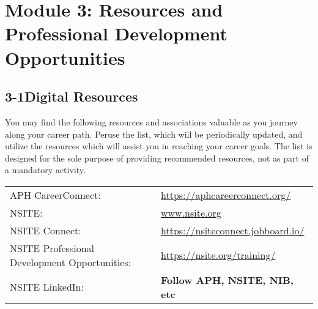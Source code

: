 \pagebreak \section*{Module 3:	Resources and Professional Development Opportunities}
\noindent\makebox[\textwidth]{\rule{\linewidth}{0.4pt}}
 \localtableofcontents
\noindent\makebox[\textwidth]{\rule{\linewidth}{0.4pt}}

\pagebreak \subsection*{3-1\quad Digital Resources}

You may find the following resources and associations valuable as you journey along your career path. Peruse the list, which will be periodically updated, and utilize the resources which will assist you in reaching your career goals. The list is designed for the sole purpose of providing recommended resources, not as part of a mandatory activity.

\begin{table}[h!]
	\centering
	\begin{tabular}{ll}
		APH CareerConnect:\dotfill                            & \href{https://aphcareerconnect.org/}{https://aphcareerconnect.org/}         \\
		NSITE:\dotfill                                        & \href{www.nsite.org}{www.nsite.org}                                         \\
		NSITE Connect:\dotfill                                & \href{https://nsiteconnect.jobboard.io/}{https://nsiteconnect.jobboard.io/} \\
		NSITE Professional Development Opportunities:\dotfill & \href{https://nsite.org/training/}{https://nsite.org/training/}             \\
		NSITE LinkedIn:\dotfill                               & \textbf{Follow APH, NSITE, NIB, etc}                                        \\
	\end{tabular}
\end{table}

